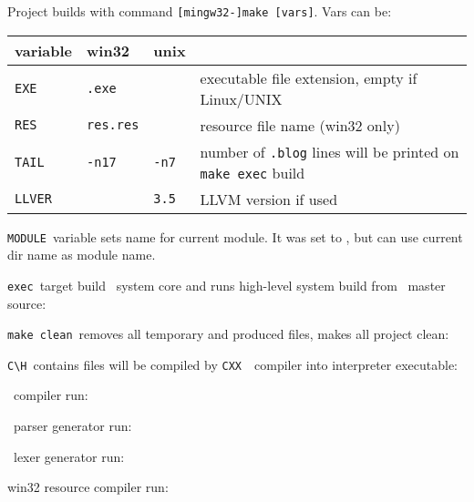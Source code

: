 \label{makes}

Project builds with command \verb|[mingw32-]make [vars]|. Vars can be:\bigskip

\begin{tabular}{l l ll }
variable & win32 & unix & \\ \hline
	\verb$EXE$ & \verb$.exe$& & executable file extension, empty if Linux/UNIX \\ 
	\verb$RES$ & \verb$res.res$& & resource file name (win32 only) \\
	\verb$TAIL$ & \verb$-n17$&\verb$-n7$ & number of \verb$.blog$ lines
will be printed on \verb$make exec$ build \\
\verb$LLVER$ & &\verb$3.5$ & LLVM version if used \\
\end{tabular}\bigskip

\verb|MODULE|\ variable sets name for current module.
It was set to \bi, but can use current dir name as module name. 


\verb|exec|\ target build \bi\ system core and runs high-level system build 
from \ master source: 


\verb|make clean|\ removes all temporary and produced files, makes all project
clean:


\verb|C\H|\ contains files will be compiled by \verb|CXX|\ \cpp\ compiler
into interpreter executable:


\cpp\ compiler run:


\ parser generator run:


\ lexer generator run:


win32 resource compiler run:

